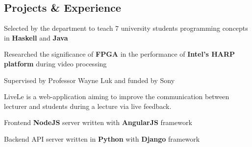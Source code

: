 \documentclass[a4paper]{deedy-resume-openfont}
\begin{document}
\begin{minipage}[t]{0.63\textwidth} 

\begin{snugshade}
\section{Projects \& Experience}
\end{snugshade}

\vspace{\topsep} %
\begin{tightemize}
\item {\small Selected by the department to teach 7 university students programming concepts in \textbf{Haskell} and \textbf{Java} }
\end{tightemize}
\sectionsep

\vskip 0.2cm

\begin{tightemize}
\item {\small Researched the significance of \textbf{FPGA} in the performance of \textbf{Intel's HARP platform} during video processing }
\item {\small Supervised by Professor Wayne Luk and
funded by Sony}
\end{tightemize}
\sectionsep

\vskip 0.2cm

LiveLe is a web-application aiming to improve the communication between lecturer and students during a lecture via live feedback.
\begin{tightemize}
\item {\small Frontend \textbf{NodeJS} server written with \textbf{AngularJS} framework}
\item {\small Backend API server written in \textbf{Python} with \textbf{Django} framework}
\end{tightemize}
\sectionsep


\end{minipage}
\end{document}
